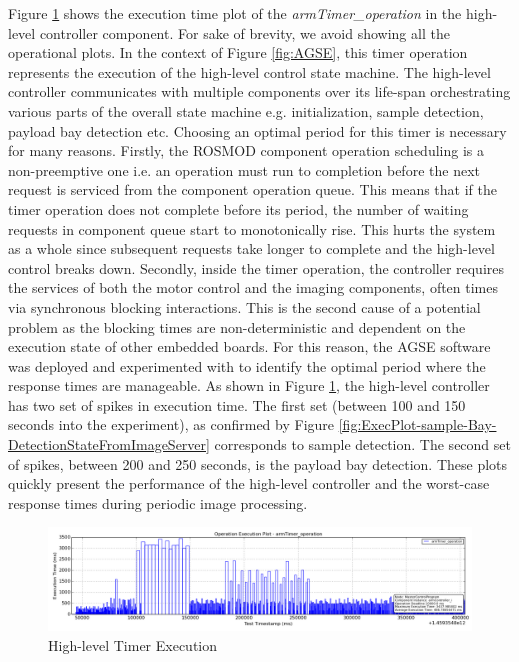 Figure \ref{fig:ExecPlot-armTimer} shows the execution time plot of the \emph{armTimer\_operation} in the high-level controller component. For sake of brevity, we avoid showing all the operational plots. In the context of Figure \ref{fig:AGSE}, this timer operation represents the execution of the high-level control state machine. The high-level controller communicates with multiple components over its life-span orchestrating various parts of the overall state machine e.g. initialization, sample detection, payload bay detection etc. Choosing an optimal period for this timer is necessary for many reasons. Firstly, the ROSMOD component operation scheduling is a non-preemptive one i.e. an operation must run to completion before the next request is serviced from the component operation queue. This means that if the timer operation does not complete before its period, the number of waiting requests in component queue start to monotonically rise. This hurts the system as a whole since subsequent requests take longer to complete and the high-level control breaks down. Secondly, inside the timer operation, the controller requires the services of both the motor control and the imaging components, often times via synchronous blocking interactions. This is the second cause of a potential problem as the blocking times are non-deterministic and dependent on the execution state of other embedded boards. For this reason, the AGSE software was deployed and experimented with to identify the optimal period where the response times are manageable. As shown in Figure \ref{fig:ExecPlot-armTimer}, the high-level controller has two set of spikes in execution time. The first set (between 100 and 150 seconds into the experiment), as confirmed by Figure \ref{fig:ExecPlot-sample-Bay-DetectionStateFromImageServer} corresponds to sample detection. The second set of spikes, between 200 and 250 seconds, is the payload bay detection. These plots quickly present the performance of the high-level controller and the worst-case response times during periodic image processing. 

\begin{figure}[t]
	\centering
	\includegraphics[width=\linewidth]{Figures/ExecPlot-armTimer.png}
	\caption{High-level Timer Execution}
	\label{fig:ExecPlot-armTimer}	
\end{figure}

